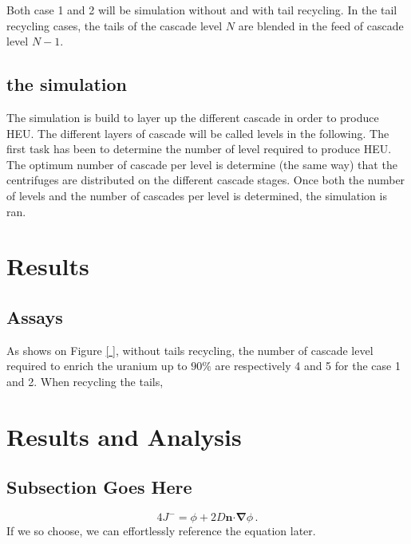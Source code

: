 \documentclass{anstrans}
\renewcommand{\vec}[1]{\bm{#1}} %
\newcommand{\vd}{\bm{\cdot}} %
\newcommand{\grad}{\vec{\nabla}} %
\begin{document}
Both case 1 and 2 will be simulation without and with tail recycling. In the
tail recycling cases, the tails of the cascade level $N$ are blended in the feed
of cascade level $N-1$.

\subsection{the simulation}
The simulation is build to layer up the different cascade in order to produce
HEU. The different layers of cascade will be called levels in the following. The
first task has been to determine the number of level required to produce HEU.
The optimum number of cascade per level is determine (the same way) that the
centrifuges are distributed on the different cascade stages.
Once both the number of levels and the number of cascades per level is
determined, the simulation is ran.


\section{Results}

\subsection{Assays}
As shows on Figure \ref{ }, without tails recycling, the number of cascade level
required to enrich the uranium up to $90\%$ are respectively 4 and 5 for the
case 1 and 2. When recycling the tails, 


\section{Results and Analysis}

\subsection{Subsection Goes Here}
\begin{equation} \label{eq:marshak}
  4 J^- = \phi + 2 D \vec{n} \vd \grad \phi \,.
\end{equation}
If we so choose, we can effortlessly reference the equation later.
\end{document}
